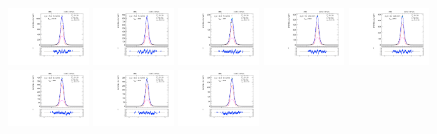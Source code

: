 \begin{figure}[htb]
\includegraphics[width=0.19\textwidth]{plots/Appendix_Recoil_Fits/ZmmMC_PF_13TeV_2G/pfu2fit_8.pdf}
\includegraphics[width=0.19\textwidth]{plots/Appendix_Recoil_Fits/ZmmMC_PF_13TeV_2G/pfu2fit_9.pdf}
\includegraphics[width=0.19\textwidth]{plots/Appendix_Recoil_Fits/ZmmMC_PF_13TeV_2G/pfu2fit_19.pdf}
\includegraphics[width=0.19\textwidth]{plots/Appendix_Recoil_Fits/ZmmMC_PF_13TeV_2G/pfu2fit_11.pdf}
\includegraphics[width=0.19\textwidth]{plots/Appendix_Recoil_Fits/ZmmMC_PF_13TeV_2G/pfu2fit_12.pdf}
\includegraphics[width=0.19\textwidth]{plots/Appendix_Recoil_Fits/ZmmMC_PF_13TeV_2G/pfu2fit_13.pdf}
\includegraphics[width=0.19\textwidth]{plots/Appendix_Recoil_Fits/ZmmMC_PF_13TeV_2G/pfu2fit_14.pdf}
\includegraphics[width=0.19\textwidth]{plots/Appendix_Recoil_Fits/ZmmMC_PF_13TeV_2G/pfu2fit_15.pdf}

\end{figure}
